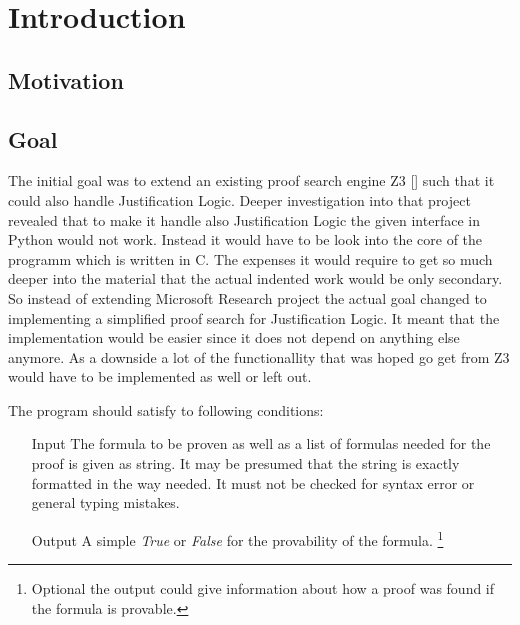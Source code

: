 \chapter{Introduction}

\section{Motivation}

\section{Goal}
\par
The initial goal was to extend an existing proof search engine Z3 [\cite{z3}] such that it could also handle Justification Logic. Deeper investigation into that project revealed that to make it handle also Justification Logic the given interface in Python would not work. Instead it would have to be look into the core of the programm which is written in C. The expenses it would require to get so much deeper into the material that the actual indented work would be only secondary.
So instead of extending Microsoft Research project the actual goal changed to implementing a simplified proof search for Justification Logic. It meant that the implementation would be easier since it does not depend on anything else anymore. As a downside a lot of the functionallity that was hoped go get from Z3 would have to be implemented as well or left out.

\par The program should satisfy to following conditions: 

\begin{itemize}
	\item[Input] The formula to be proven as well as a list of formulas needed for the proof is given as string. It may be presumed that the string is exactly formatted in the way needed. It must not be checked for syntax error or general typing mistakes.
	\item[Output] A simple \emph{True} or \emph{False} for the provability of the formula. \footnote{Optional the output could give information about how a proof was found if the formula is provable.}
\end{itemize}

